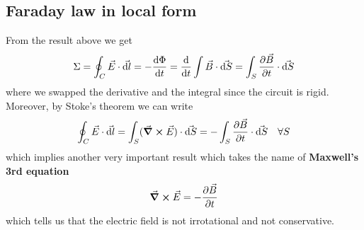 \documentclass[12pt]{extarticle}
\begin{document}
\subsection{Faraday law in local form}

From the result above we get
\begin{equation}
    \Sigma = \oint_C \vec E \cdot \vec{\dd l } = - \dv{\Phi}{t} = \dv{t} \int \vec B \cdot \vec{\dd S} = \int_S \pdv{\vec B}{t} \cdot \vec{\dd S}
\end{equation}
where we swapped the derivative and the integral since the circuit is rigid.
Moreover, by Stoke's theorem we can write
\begin{equation}
    \oint_C \vec E \cdot \vec{\dd l} = \int_S (\curl \vec E) \cdot \vec {\dd{S}} = - \int_S\pdv{\vec B}{t} \cdot \vec{\dd S} \quad \forall S
\end{equation}
which implies another very important result which takes the name of \textbf{Maxwell's 3rd equation}
\begin{equation}
    \curl \vec E = - \pdv{\vec B}{t}
\end{equation}
which tells us that the electric field is not irrotational and not conservative.
\end{document}
